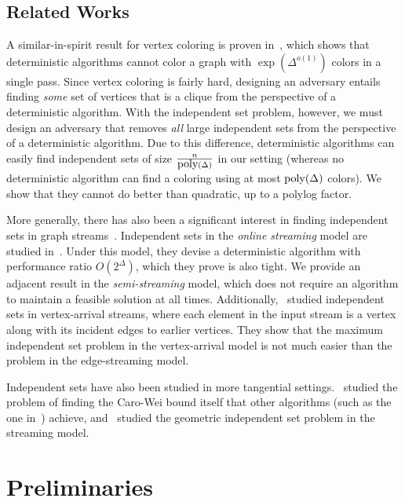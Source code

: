 \documentclass[11pt]{article}
\begin{document}
\subsection{Related Works}

A similar-in-spirit result for vertex coloring is proven in~\cite{assadi2022deterministic}, which shows that deterministic algorithms cannot color a graph with $\exp(\Delta^{o(1)})$ colors in a single pass. Since vertex coloring is fairly hard, designing an adversary entails finding \textit{some} set of vertices that is a clique from the perspective of a deterministic algorithm. With the independent set problem, however, we must design an adversary that removes \textit{all} large independent sets from the perspective of a deterministic algorithm. Due to this difference, deterministic algorithms can easily find independent sets of size $\frac n{\mbox{\rm poly}(\Delta)}$ in our setting (whereas no deterministic algorithm can find a coloring using at most $\mbox{\rm poly}(\Delta)$ colors). We show that they cannot do better than quadratic, up to a polylog factor. 

More generally, there has also been a significant interest in finding independent sets in graph streams\ \cite{ahn2015correlation, assadi2024log, halldorsson2010streaming, chen2023sublinear, cormode2017independent, bhore2022streaming, bakshi2019weighted}. Independent sets in the \textit{online streaming} model are studied in~\cite{halldorsson2016streaming}. Under this model, they devise a deterministic algorithm with performance ratio $O(2^{\Delta})$, which they prove is also tight. We provide an adjacent result in the \textit{semi-streaming} model, which does not require an algorithm to maintain a feasible solution at all times. Additionally,\ \cite{cormode2018independent} studied independent sets in vertex-arrival streams, where each element in the input stream is a vertex along with its incident edges to earlier vertices. They show that the maximum independent set problem in the vertex-arrival model is not much easier than the problem in the edge-streaming model. 

Independent sets have also been studied in more tangential settings.\ \cite{cormode2018approximating} studied the problem of finding the Caro-Wei bound itself that other algorithms (such as the one in\ \cite{halldorsson2010streaming}) achieve, and\ \cite{bhore2022streaming} studied the geometric independent set problem in the streaming model. 


\section{Preliminaries}
\newcommand{\Partition}{\textnormal{\textsc{Partition}}}
\newcommand{\CP}{\mathcal{P}}
\end{document}
